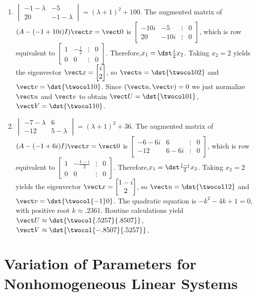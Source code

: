 \documentclass[openany]{book}
\newenvironment{sectionSolutions}{
 \begin{enumerate}[item-label={\thesection.\arabic{enumi}.}]
}{
 \end{enumerate}
}
\begin{document}
\begin{sectionSolutions}
\item
$\begin{vmatrix}-1-\lambda&-5\\20&-1-\lambda
\end{vmatrix}=(\lambda+1)^2+100$.
The augmented matrix of $(A-(-1+10i)I){\vect x}={\vect 0}$ is
$\begin{bmatrix}-10i&-5&\vdots&0\\
20&-10i&\vdots&0 \end{bmatrix}$,
which is row equivalent to
$\begin{bmatrix} 1&-\frac{i}{2}&\vdots&0\\ 0&0&\vdots&0
\end{bmatrix}$.
Therefore,$x_1=\dst\frac{i}{2}x_2$. Taking $x_2=2$
yields the eigenvector
 ${\vect x}=\begin{bmatrix}i\\2\end{bmatrix}$,
so ${\vect u}=\dst{\twocol02}$ and ${\vect v}=\dst{\twocol10}$.
Since $({\vect u},{\vect v})=0$ we just normalize ${\vect u}$ and ${\vect v}$
to obtain
${\vect U}=\dst{\twocol01}$, ${\vect V}=\dst{\twocol10}$.


\item
$\begin{vmatrix}-7-\lambda&6\\-12&5-\lambda
\end{vmatrix}=(\lambda+1)^2+36$.
The augmented matrix of $(A-(-1+6i)I){\vect x}={\vect 0}$ is
$\begin{bmatrix}-6-6i&6&\vdots&0\\
-12&6-6i&\vdots&0 \end{bmatrix}$,
which is row equivalent to
$\begin{bmatrix} 1&-\frac{1-i}{2}&\vdots&0\\ 0&0&\vdots&0
\end{bmatrix}$.
Therefore,$x_1=\dst\frac{1-i}{2}x_2$. Taking $x_2=2$
yields the eigenvector
 ${\vect x}=\begin{bmatrix}1-i\\2\end{bmatrix}$,
so ${\vect u}=\dst{\twocol12}$ and ${\vect v}=\dst{\twocol{-1}0}$.
The quadratic equation is $-k^2-4k+1=0$, with positive root
$k\approx.2361$.
 Routine calculations yield
 ${\vect U}\approx\dst{\twocol{.5257}{.8507}}$,
${\vect V}\approx\dst{\twocol{-.8507}{.5257}}$.
\end{sectionSolutions}


\section{Variation of Parameters for Nonhomogeneous Linear Systems}
\end{document}
